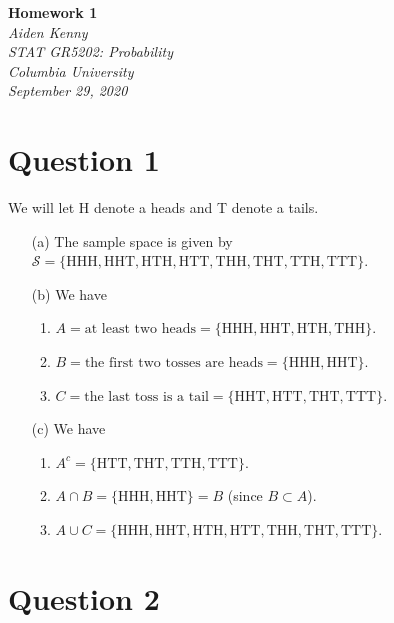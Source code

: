 \documentclass[10pt]{article}
\begin{document}
\newcommand{\mytitle}{Homework 1}
\newcommand{\myauthor}{Aiden Kenny}
\newcommand{\myclass}{STAT GR5202: Probability}
\newcommand{\myschool}{Columbia University}
\newcommand{\mydate}{September 29, 2020}
\begin{flushright}
    \textbf{\mytitle}\\[0.5em]
    \textsl{\myauthor}\\
    \textsl{\myclass}\\
    \textsl{\myschool}\\
    \textsl{\mydate}
\end{flushright} \vspace{1em}

\section{Question 1} \noindent
We will let H denote a heads and T denote a tails.
\begin{itemize}
    \item[(a)] The sample space is given by \(\mathcal{S} = \{\mathrm{HHH, HHT, HTH, HTT, THH, THT, TTH, TTT}\}\).
    \item[(b)] We have
    \begin{enumerate}
        \item \(A = \text{at least two heads} = \{\mathrm{HHH, HHT, HTH, THH}\}\).
        \item \(B = \text{the first two tosses are heads} = \{\mathrm{HHH, HHT}\}\).
        \item \(C = \text{the last toss is a tail} = \{\mathrm{HHT, HTT, THT, TTT}\}\).
    \end{enumerate}
    \item[(c)] We have 
    \begin{enumerate}
        \item \(A^c = \{\mathrm{HTT, THT, TTH, TTT}\}\).
        \item \(A \cap B = \{\mathrm{HHH, HHT}\} = B\) (since \(B \subset A\)).
        \item \(A \cup C = \{\mathrm{HHH, HHT, HTH, HTT, THH, THT, TTT}\}\).
    \end{enumerate}
\end{itemize}

\section{Question 2} \noindent
\end{document}
